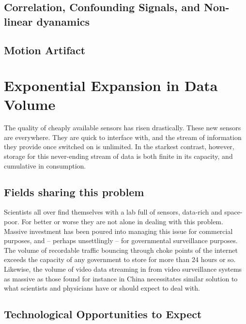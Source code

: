 \documentclass[
  12pt,
]{report}
\numberwithin{figure}{section}
\numberwithin{table}{section}
\numberwithin{equations}{section}
\begin{document}
\hypertarget{correlation-confounding-signals-and-non-linear-dyanamics}{%
\subsection{Correlation, Confounding Signals, and Non-linear
dyanamics}\label{correlation-confounding-signals-and-non-linear-dyanamics}}

\hypertarget{motion-artifact}{%
\subsection{Motion Artifact}\label{motion-artifact}}

\hypertarget{exponential-expansion-in-data-volume}{%
\section{Exponential Expansion in Data
Volume}\label{exponential-expansion-in-data-volume}}

The quality of cheaply available sensors has risen drastically. These
new sensors are everywhere. They are quick to interface with, and the
stream of information they provide once switched on is unlimited. In the
starkest contrast, however, storage for this never-ending stream of data
is both finite in its capacity, and cumulative in consumption.

\hypertarget{fields-sharing-this-problem}{%
\subsection{Fields sharing this
problem}\label{fields-sharing-this-problem}}

Scientists all over find themselves with a lab full of sensors,
data-rich and space-poor. For better or worse they are not alone in
dealing with this problem. Massive investment has been poured into
managing this issue for commercial purposes, and -- perhaps unsettlingly
-- for governmental surveillance purposes. The volume of recordable
traffic bouncing through choke points of the internet exceeds the
capacity of any government to store for more than 24 hours or so.
Likewise, the volume of video data streaming in from video surveillance
systems as massive as those found for instance in China necessitates
similar solution to what scientists and physicians have or should expect
to deal with.

\hypertarget{technological-opportunities-to-expect}{%
\subsection{Technological Opportunities to
Expect}\label{technological-opportunities-to-expect}}
\end{document}
